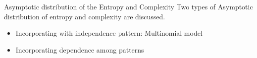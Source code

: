 \documentclass{beamer}
\begin{document}


\begin{frame}{Asymptotic distribution of the Entropy and Complexity}
	Two types of Asymptotic distribution of entropy and complexity are discussed.
	\begin{itemize}
		\item Incorporating with independence pattern: Multinomial model 
		\item Incorporating dependence among patterns
	\end{itemize}
\end{frame}

\end{document}
